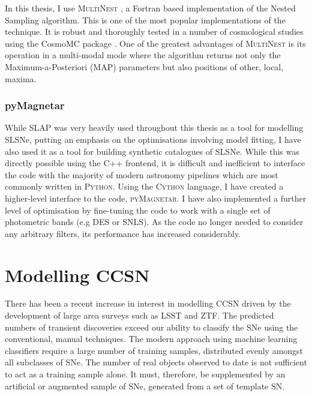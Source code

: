 In this thesis, I use \textsc{MultiNest} \citep{Feroz2009,Feroz2011,Feroz2013}, a Fortran based implementation of the Nested Sampling algorithm. This is one of the most popular implementations of the technique. It is robust and thoroughly tested in a number of cosmological studies using the CosmoMC package \citep{Lewis2002}. One of the greatest advantages of \textsc{MultiNest} is its operation in a multi-modal mode where the algorithm returns not only the Maximum-a-Posteriori (MAP) parameters but also positions of other, local, maxima.

\subsubsection{pyMagnetar}
While SLAP was very heavily used throughout this thesis as a tool for modelling SLSNe, putting an emphasis on the optimisations involving model fitting, I have also used it as a tool for building synthetic catalogues of SLSNe. While this was directly possible using the C++ frontend, it is difficult and inefficient to interface the code with the majority of modern astronomy pipelines which are most commonly written in \textsc{Python}. Using the \textsc{Cython} language, I have created a higher-level interface to the code, \textsc{pyMagnetar}. I have also implemented a further level of optimisation by fine-tuning the code to work with a single set of photometric bands (e.g DES or SNLS). As the code no longer needed to consider any arbitrary filters, its performance has increased considerably.

\section{Modelling CCSN}
There has been a recent increase in interest in modelling CCSN driven by the development of large area surveys such as LSST and ZTF. The predicted numbers of transient discoveries exceed our ability to classify the SNe using the conventional, manual techniques. The modern approach using machine learning classifiers require a large number of training samples, distributed evenly amongst all subclasses of SNe. The number of real objects observed to date is not sufficient to act as a training sample alone. It must, therefore, be supplemented by an artificial or augmented sample of SNe, generated from a set of template SN.

